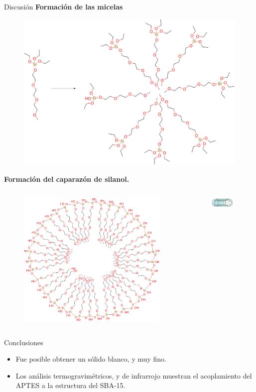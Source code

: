 \documentclass[handout]{beamer}
\begin{document}
\begin{frame}{Discusi\'on}
	\textbf{Formaci\'on de las micelas}
	\begin{figure}[h]
		\centering
		\includegraphics[width = 0.3\linewidth]{../structures/micelaSi.png}
	\end{figure}
	\textbf{Formaci\'on del caparaz\'on de silanol.}
	\begin{columns}
		\begin{column}{0.5\textwidth}
			\begin{figure}[h]
				\centering
				\includegraphics[width = 0.8\linewidth]{../structures/micelaSi2.png}
			\end{figure}
		\end{column}
		\begin{column}{0.5\textwidth}
			\begin{figure}[h]
				\centering
				\includegraphics[width = 0.8\linewidth]{../structures/micela3D.png}
			\end{figure}
		\end{column}
	\end{columns}
\end{frame}

\begin{frame}{Conclusiones}
	\begin{itemize}
		\item Fue posible obtener un s\'olido blanco, y muy fino.
		\item Los an\'alisis termogravim\'etricos, y de infrarrojo muestran el acoplamiento del APTES a la estructura del SBA-15.
	\end{itemize}
\end{frame}
\end{document}
